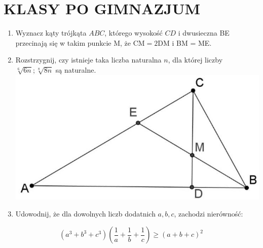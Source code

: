 \documentclass[10pt]{article}
\begin{document}
\section*{KLASY PO GIMNAZJUM}
\begin{enumerate}
  \item Wyznacz kąty trójkąta \(A B C\), którego wysokość \(C D\) i dwusieczna BE przecinają się w takim punkcie M, że \(\mathrm{CM}=2 \mathrm{DM}\) i BM = ME.
  \item Rozstrzygnij, czy istnieje taka liczba naturalna \(n\), dla której liczby \(\sqrt[6]{6 n} ; \sqrt[8]{8 n}\) są naturalne.\\
\includegraphics[max width=\textwidth, center]{2024_11_21_b91e86a5070ac23144a8g-1}
  \item Udowodnij, że dla dowolnych liczb dodatnich \(a, b, c\), zachodzi nierówność:
\end{enumerate}

\[
\left(a^{3}+b^{3}+c^{3}\right)\left(\frac{1}{a}+\frac{1}{b}+\frac{1}{c}\right) \geq(a+b+c)^{2}
\]
\end{document}

